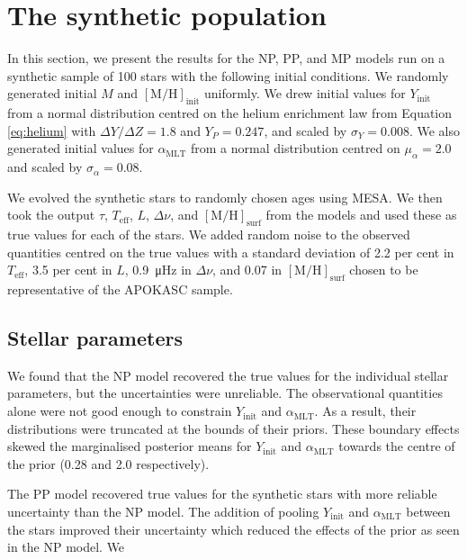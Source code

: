 \documentclass[a4paper,fleqn,usenatbib]{mnras}
\newcommand{\dnu}{\ensuremath{\Delta\nu}}
\newcommand{\metallicity}{\ensuremath{[\mathrm{M}/\mathrm{H}]}}
\newcommand{\teff}{\ensuremath{T_\mathrm{eff}}}
\newcommand{\mlt}{\ensuremath{{\alpha_\mathrm{MLT}}}}
\begin{document}
\section{The synthetic population}\label{sec:test-stars}


In this section, we present the results for the NP, PP, and MP models run on a synthetic sample of 100 stars with the following initial conditions. We randomly generated initial $M$ and $\metallicity_\mathrm{init}$ uniformly. We drew initial values for $Y_\mathrm{init}$ from a normal distribution centred on the helium enrichment law from Equation \ref{eq:helium} with $\Delta Y / \Delta Z = 1.8$ and $Y_P = 0.247$, and scaled by $\sigma_Y = 0.008$. We also generated initial values for $\mlt$ from a normal distribution centred on $\mu_\alpha = 2.0$ and scaled by $\sigma_\alpha = 0.08$.

We evolved the synthetic stars to randomly chosen ages using \textsc{MESA}. We then took the output $\tau$, $\teff$, $L$, $\dnu$, and $\metallicity_\mathrm{surf}$ from the models and used these as true values for each of the stars. We added random noise to the observed quantities centred on the true values with a standard deviation of 2.2 per cent in $\teff$, 3.5 per cent in $L$, \SI{0.9}{\micro\hertz} in $\dnu$, and \SI{0.07}{\dex} in $\metallicity_\mathrm{surf}$ chosen to be representative of the APOKASC sample.

\subsection{Stellar parameters}

We found that the NP model recovered the true values for the individual stellar parameters, but the uncertainties were unreliable. The observational quantities alone were not good enough to constrain $Y_\mathrm{init}$ and $\mlt$. As a result, their distributions were truncated at the bounds of their priors. These boundary effects skewed the marginalised posterior means for $Y_\mathrm{init}$ and $\mlt$ towards the centre of the prior (0.28 and 2.0 respectively).

The PP model recovered true values for the synthetic stars with more reliable uncertainty than the NP model. The addition of pooling $Y_\mathrm{init}$ and $\mlt$ between the stars improved their uncertainty which reduced the effects of the prior as seen in the NP model. We
\end{document}
